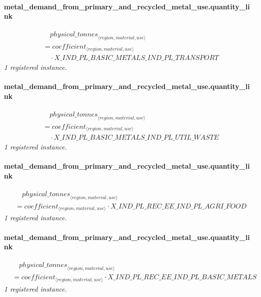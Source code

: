 \documentclass[11pt]{article}
\begin{document}
\paragraph{metal\_demand\_from\_primary\_and\_recycled\_metal\_use.quantity\_link}
\begin{align*}
&\quad {physical\_tonnes}_{\langle region, material, use\rangle}\\
&= coefficient_{\langle region, material, use\rangle}\\
&\quad {}\cdot X\_IND\_PL\_BASIC\_METALS\_IND\_PL\_TRANSPORT
\end{align*}
\noindent\emph{1 registered instance.}\par
\paragraph{metal\_demand\_from\_primary\_and\_recycled\_metal\_use.quantity\_link}
\begin{align*}
&\quad {physical\_tonnes}_{\langle region, material, use\rangle}\\
&= coefficient_{\langle region, material, use\rangle}\\
&\quad {}\cdot X\_IND\_PL\_BASIC\_METALS\_IND\_PL\_UTIL\_WASTE
\end{align*}
\noindent\emph{1 registered instance.}\par
\paragraph{metal\_demand\_from\_primary\_and\_recycled\_metal\_use.quantity\_link}
\begin{align*}
&\quad {physical\_tonnes}_{\langle region, material, use\rangle}\\
&= coefficient_{\langle region, material, use\rangle} \cdot X\_IND\_PL\_REC\_EE\_IND\_PL\_AGRI\_FOOD
\end{align*}
\noindent\emph{1 registered instance.}\par
\paragraph{metal\_demand\_from\_primary\_and\_recycled\_metal\_use.quantity\_link}
\begin{align*}
&\quad {physical\_tonnes}_{\langle region, material, use\rangle}\\
&= coefficient_{\langle region, material, use\rangle} \cdot X\_IND\_PL\_REC\_EE\_IND\_PL\_BASIC\_METALS
\end{align*}
\noindent\emph{1 registered instance.}\par
\end{document}
